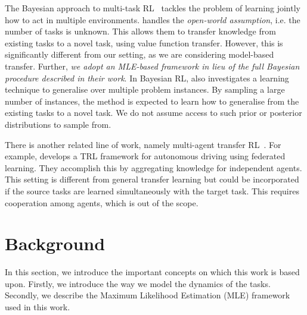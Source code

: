 The Bayesian approach to multi-task RL~\citep{wilson2007multi, lazaric2010bayesian} tackles the problem of learning jointly how to act in multiple environments. \citep{lazaric2010bayesian} handles the \emph{open-world assumption}, i.e. the number of tasks is unknown. This allows them to transfer knowledge from existing tasks to a novel task, using value function transfer. However, this is significantly different from our setting, as we are considering model-based transfer. Further, \textit{we adopt an MLE-based framework in lieu of the full Bayesian procedure described in their work}.
In Bayesian RL, \citep{tamar2022regularization} also investigates a learning technique to generalise over multiple problem instances. By sampling a large number of instances, the method is expected to learn how to generalise from the existing tasks to a novel task. We do not assume access to such prior or posterior distributions to sample from.

There is another related line of work, namely multi-agent transfer RL~\citep{da2019survey}. For example, \citep{liang2023federated} develops a TRL framework for autonomous driving using federated learning. They accomplish this by aggregating knowledge for independent agents. This setting is different from general transfer learning but could be incorporated if the source tasks are learned simultaneously with the target task. This requires cooperation among agents, which is out of the scope.%

\section{Background}\label{sec:background}

In this section, we introduce the important concepts on which this work is based upon. Firstly, we introduce the way we model the dynamics of the tasks. Secondly, we describe the Maximum Likelihood Estimation (MLE) framework used in this work.

